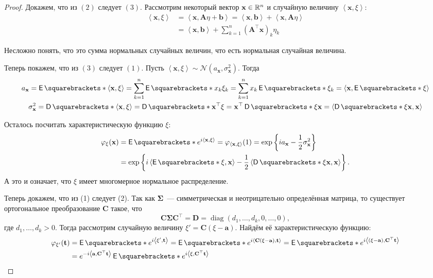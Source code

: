 \begin{proof}
	Докажем, что из \((2)\) следует \((3)\). Рассмотрим некоторый вектор 
	\(\mathbf{x} \in \mathbb{R}^n\) и случайную величину \(\left\langle\mathbf{x}, 
	\xi\right\rangle\):
	\begin{align*}
		\left\langle\mathbf{x}, \xi\right\rangle &= \left\langle\mathbf{x}, 
		\mathbf{A}\eta + \mathbf{b}\right\rangle = \left\langle\mathbf{x}, 
		\mathbf{b}\right\rangle + \left\langle\mathbf{x},  
		\mathbf{A}\eta\right\rangle \\
		&= \left\langle\mathbf{x}, \mathbf{b}\right\rangle + \sum_{k = 1}^{n} 
		\left(\mathbf{A^{\top} x}\right)_{k}\eta_{k}
	\end{align*}

	Несложно понять, что это сумма нормальных случайных величин, что есть 
	нормальная случайная величина.
	
	Теперь покажем, что из \((3)\) следует \((1)\). Пусть 
	\(\left\langle\mathbf{x}, \xi\right\rangle \sim \mathcal{N}(a_{\mathbf{x}}, 
	\sigma_{\mathbf{x}}^2)\). Тогда
	\begin{gather*}
		a_{\mathbf{x}} = \E{\left\langle\mathbf{x}, \xi\right\rangle} = \sum_{k 
		= 1}^{n} \E{x_{k}\xi_{k}} = \sum_{k = 1}^{n} x_{k}\E{\xi_{k}} = 
		\left\langle\mathbf{x}, \E{\xi}\right\rangle \\
		\sigma_{\mathbf{x}}^2 = \D{\left\langle\mathbf{x}, \xi\right\rangle} =  
		\D{\mathbf{x}^{\top}\xi} = \mathbf{x}^{\top}\D{\xi}\mathbf{x} = 
		\left\langle\D{\xi}\mathbf{x}, \mathbf{x}\right\rangle
	\end{gather*}

	Осталось посчитать характеристическую функцию \(\xi\):
	\begin{align}
		\phi_{\xi}(\mathbf{x}) &= \E{e^{i\left\langle\mathbf{x}, 
		\xi\right\rangle}} = \phi_{\left\langle\mathbf{x}, \xi\right\rangle}(1) 
		= \exp\left\{ia_{\mathbf{x}} - \frac{1}{2}\sigma_{\mathbf{x}}^2\right\} 
		\\
		&= \exp\left\{i\left\langle\E{\xi}, \mathbf{x}\right\rangle - 
		\frac{1}{2}\left\langle\D{\xi}\mathbf{x}, 
		\mathbf{x}\right\rangle\right\}.
	\end{align}
	А это и означает, что \(\xi\) имеет многомерное нормальное распределение.
	
	Теперь докажем, что из (1) следует (2). Так как \(\mathbf{\Sigma}\)~--- 
	симметрическая и неотрицательно определённая матрица, то существует 
	ортогональное преобразование \(\mathbf{C}\) такое, что
	\[
		\mathbf{C \Sigma C}^{\top} = \mathbf{D} = \operatorname{diag}(d_1, 
		\dots, d_k, 0, \dots, 0),
	\]
	где \(d_1, \dots, d_k > 0\). Тогда рассмотрим случайную величину \(\xi' = 
	\mathbf{C}(\xi - \mathbf{a})\). Найдём её характеристическую функцию:
	\begin{align*}
		\phi_{\xi'}(\mathbf{t}) &= \E{e^{i\left\langle \xi', 
		\mathbf{t}\right\rangle}} = \E{e^{i\left\langle \mathbf{C}(\xi - 
		\mathbf{a}), \mathbf{t}\right\rangle}} = \E{e^{i\left\langle (\xi - 
		\mathbf{a}), \mathbf{C}^{\top}\mathbf{t}\right\rangle}} \\
		&= e^{-i\left\langle \mathbf{a}, 
		\mathbf{C}^{\top}\mathbf{t}\right\rangle}\E{e^{i\left\langle \xi, 
		\mathbf{C}^{\top}\mathbf{t}\right\rangle}}
	\end{align*}
	

\end{proof}
